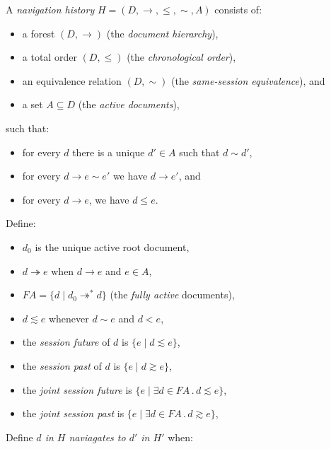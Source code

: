 \documentclass{article}
\newcommand{\aNH}{H}
\newcommand{\Docs}{D}
\newcommand{\Active}{A}
\newcommand{\FullyActive}{F\!A}
\newcommand{\parentOf}{\rightarrow}
\newcommand{\parentOfActive}{\twoheadrightarrow}
\newcommand{\leChron}{\le}
\newcommand{\ltChron}{<}
\newcommand{\eqSess}{\sim}
\newcommand{\ltSess}{\lesssim}
\newcommand{\gtSess}{\gtrsim}
\newcommand{\rootDoc}{d_0}
\newcommand{\aDoc}{d}
\newcommand{\bDoc}{e}
\newcommand{\st}{\mathbin.}
\begin{document}
A \emph{navigation history} $\aNH=(\Docs,{\parentOf},{\leChron},{\eqSess},\Active)$ consists of:
\begin{itemize}
\item a forest $(\Docs,{\parentOf})$ (the \emph{document hierarchy}),
\item a total order $(\Docs,{\leChron})$ (the \emph{chronological order}),
\item an equivalence relation $(\Docs,{\eqSess})$ (the \emph{same-session equivalence}), and
\item a set $\Active \subseteq \Docs$ (the \emph{active documents}),
\end{itemize}
such that:
\begin{itemize}
\item for every $\aDoc$ there is a unique $\aDoc'\in\Active$ such that $\aDoc \eqSess \aDoc'$,
\item for every $\aDoc \parentOf \bDoc \eqSess \bDoc'$
  we have $\aDoc \parentOf \bDoc'$, and
\item for every $\aDoc \parentOf \bDoc$, we have $\aDoc \leChron \bDoc$.
\end{itemize}
Define:
\begin{itemize}
\item $\rootDoc$ is the unique active root document,
\item $\aDoc \parentOfActive \bDoc$ when $\aDoc \parentOf \bDoc$ and $\bDoc \in \Active$,
\item $\FullyActive = \{ \aDoc \mid \rootDoc \parentOfActive^* \aDoc \}$
  (the \emph{fully active} documents),
\item $\aDoc \ltSess \bDoc$ whenever $\aDoc \eqSess \bDoc$ and $\aDoc \ltChron \bDoc$,
\item the \emph{session future} of $\aDoc$ is $\{ \bDoc \mid \aDoc \ltSess \bDoc \}$,
\item the \emph{session past} of $\aDoc$ is $\{ \bDoc \mid \aDoc \gtSess \bDoc \}$,
\item the \emph{joint session future} is $\{ \bDoc \mid \exists \aDoc \in \FullyActive \st \aDoc \ltSess \bDoc \}$,
\item the \emph{joint session past} is $\{ \bDoc \mid \exists \aDoc \in \FullyActive \st \aDoc \gtSess \bDoc \}$,
\end{itemize}
Define \emph{$\aDoc$ in $\aNH$ naviagates to $\aDoc'$ in $\aNH'$} when:
\end{document}
